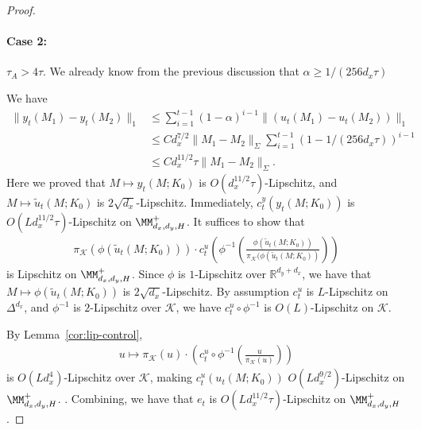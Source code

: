 \begin{proof}
\paragraph{Case 2:} $\tau_A>4\tau$. 
We already know from the previous discussion that $\alpha\ge 1/(256d_x \tau)$


We have
\begin{align*}
\|y_t(M_1)-y_t(M_2)\|_1&\le\sum_{i=1}^{t-1}(1-\alpha)^{i-1}\|(u_t(M_1)-u_t(M_2))\|_1\\
&\le Cd_x^{7/2}\|M_1-M_2\|_{\Sigma}\sum_{i=1}^{t-1}(1-1/(256d_x\tau))^{i-1}\\
&\le C d_x^{11/2}\tau\|M_1-M_2\|_{\Sigma}.
\end{align*}
Here we proved that $M\mapsto y_t(M;K_0)$ is $O(d_x^{11/2}\tau)$-Lipschitz, and $M\mapsto \tilde{u}_t(M;K_0)$ is $2\sqrt{d_x}$-Lipschitz. Immediately, $c_t^y(y_t(M;K_0))$ is $O(Ld_x^{11/2}\tau)$-Lipschitz on $\MM_{d_x,d_y,H}^{+}$. It suffices to show that
\begin{align*}
\pi_{\mathcal{K}}(\phi(\tilde{u}_t(M;K_0))) \cdot c_t^u(\phi^{-1}(\frac{\phi(\tilde{u}_t(M;K_0))}{\pi_{\mathcal{K}}(\phi(\tilde{u}_t(M;K_0))}))
\end{align*}
is Lipschitz on $\MM_{d_x,d_y,H}^{+}$. Since $\phi$ is $1$-Lipschitz over $\mathbb{R}^{d_y+d_x}$, we have that $M\mapsto \phi(\tilde{u}_t(M;K_0))$ is $2\sqrt{d_x}$-Lipschitz. By assumption $c_t^{u}$ is $L$-Lipschitz on $\Delta^{d_x}$, and $\phi^{-1}$ is $2$-Lipschitz over $\mathcal{K}$, we have $c_t^{u}\circ\phi^{-1}$ is $O(L)$-Lipschitz on $\mathcal{K}$. 

By Lemma~\ref{cor:lip-control}, 
\begin{align*}
u\mapsto \pi_{\mathcal{K}}(u)\cdot \left(c_t^u\circ\phi^{-1} \left(\frac{u}{\pi_{\mathcal{K}}(u)}\right)\right)
\end{align*}
is $O(Ld_x^{4})$-Lipschitz over $\mathcal{K}$, making $c_t^u(u_t(M;K_0))$ $O(Ld_x^{9/2})$-Lipschitz on $\MM_{d_x,d_y,H}^{+}$.  . Combining, we have that $e_t$ is $O(Ld_x^{11/2}\tau)$-Lipschitz on $\MM_{d_x,d_y,H}^{+}$.  
\end{proof}

